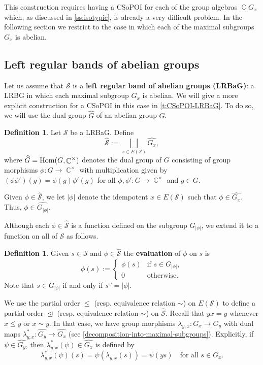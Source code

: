 \documentclass[11pt, oneside, reqno]{amsart}
\theoremstyle{definition}
\newtheorem{definition}[theorem]{Definition}
\numberwithin{equation}{section}
\DeclareMathOperator{\C}{\mathbb{C}}
\newcommand{\defn}[1]{{\color{RoyalBlue}\bf#1}}
\def \SS{{\mathcal{S}}}
\def \kk{\C}
\def \wh{\widehat}
\DeclareMathOperator{\chleq}{\unlhd}
\newcommand{\abs}[1]{|{#1}|} 				%
\begin{document}
This construction requires having a CSoPOI for each of the group algebras $\kk G_x$ which, as discussed in \cref{ss:isotypic}, is already a very difficult problem.
In the following section we restrict to the case in which each of the maximal subgroups $G_x$ is abelian.

\subsection{Left regular bands of abelian groups}\label{sec:LRBaG}

Let us assume that $\SS$ is a \defn{left regular band of abelian groups (LRBaG)}: a LRBG in which each maximal subgroup $G_x$ is abelian. We will give a more explicit construction for a CSoPOI in this case in \cref{t:CSoPOI-LRBaG}. To do so, we will use the dual group $\wh{G}$ of an abelian group $G$.

\begin{definition}\label{def:S-hat}
    Let $\SS$ be a LRBaG. Define
    \[
        \wh{\SS} := \bigsqcup_{x \in E(\SS)} \wh{G_x},
    \]
    where $\wh{G} = {\rm Hom}(G,\kk^\times)$ denotes the dual group of $G$
    consisting of group morphisms $\phi: G \to \kk^\times$ with multiplication given by
    $(\phi \phi')(g) = \phi(g) \phi'(g)$ for all $\phi, \phi': G \to \kk^\times$ and $g \in G$.

    Given $\phi \in \wh{\SS}$, we let $\abs{\phi}$ denote the idempotent $x \in
    E(\SS)$ such that $\phi \in \wh{G_{x}}$.
    Thus, $\phi \in \wh{G_{\abs{\phi}}}$.
\end{definition}

Although each $\phi \in \wh{\SS}$ is a function
defined on the subgroup $G_{|\phi|}$, we extend it to a function on all of $\SS$ as follows.

\begin{definition}\label{def:evaluation}
    Given $s \in \SS$ and $\phi \in \wh{\SS}$ the \defn{evaluation} of $\phi$ on $s$ is 
    \[
        \phi(s) := \begin{cases}
            \phi(s) & \text{if } s \in G_{\abs{\phi}},\\
            0 & \text{otherwise.}
        \end{cases}
    \]
    Note that $s \in G_{\abs{\phi}}$ if and only if $s^\omega = \abs{\phi}$.
\end{definition}


We use the partial order $\leq$ (resp. equivalence relation $\sim$) on $E(\SS)$ to define a partial order $\chleq$ (resp. equivalence relation $\sim$) on $\wh{\SS}$.
Recall that $yx = y$ whenever $x \leq y$ or $x \sim y$.
In that case, we have group morphisms $\lambda_{y,x} : G_x \to G_y$ with dual maps $\lambda_{y,x}^* : \wh{G_y} \to \wh{G_x}$
(see \cref{decomposition-into-maximal-subgroups}).
Explicitly, if $\psi \in \wh{G_y}$, then $\lambda_{y,x}^*(\psi) \in \wh{G_x}$ is defined by
\[
    \lambda_{y,x}^*(\psi)(s) = \psi(\lambda_{y,x}(s)) = \psi(y s) \quad\text{for all } s \in G_x.
\]
\end{document}
